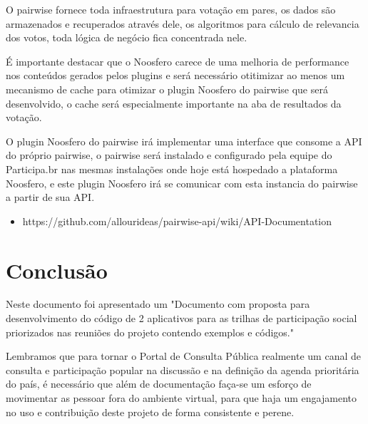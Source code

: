\documentclass[12pt]{article}
\newcommand{\ProductDescription}{"Documento com proposta para desenvolvimento
  do código de 2 aplicativos para as trilhas de participação social
  priorizados nas reuniões do projeto contendo exemplos e códigos."
}
\begin{document}
O pairwise fornece toda infraestrutura para votação em pares, os dados são
armazenados e recuperados através dele, os algoritmos para cálculo de
relevancia dos votos, toda lógica de negócio fica concentrada nele.

É importante destacar que o Noosfero carece de uma melhoria de performance nos
conteúdos gerados pelos plugins e será necessário otitimizar ao menos um
mecanismo de cache para otimizar o plugin Noosfero do pairwise que será
desenvolvido, o cache será especialmente importante na aba de resultados
da votação.

O plugin Noosfero do pairwise irá implementar uma interface que consome a
API do próprio pairwise, o pairwise será instalado e configurado
pela equipe do Participa.br nas mesmas instalações onde hoje está hospedado a
plataforma Noosfero, e este plugin Noosfero irá se comunicar com esta
instancia do pairwise a partir de sua API.

\begin{itemize}
  \item https://github.com/allourideas/pairwise-api/wiki/API-Documentation
\end{itemize}

\section{Conclusão}

Neste documento foi apresentado um \ProductDescription

Lembramos que para tornar o Portal de Consulta Pública realmente um canal de
consulta e participação popular na discussão e na definição da agenda
prioritária do país, é necessário que além de documentação faça-se um esforço
de movimentar as pessoar fora do ambiente virtual, para que haja um
engajamento no uso e contribuição deste projeto de forma consistente e perene.

\newpage

\newpage
\listoffigures
\newpage
\printindex
\newpage

\newpage
\appendix
\appendixpage 

\end{document}
